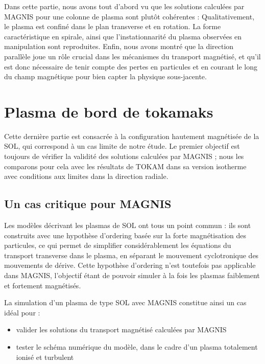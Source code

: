 \begin{refsection}
Dans cette partie, nous avons tout d'abord vu que 
les solutions calculées par MAGNIS pour une colonne de plasma
sont plutôt cohérentes : Qualitativement, le plasma est confiné dans le plan
transverse et en rotation. La forme caractéristique en spirale, ainsi que
l'instationnarité du plasma observées en manipulation sont reproduites. 
Enfin, nous avons montré que la direction parallèle joue un rôle crucial dans
les mécanismes du transport magnétisé, et qu'il est donc nécessaire de
tenir compte des pertes en particules et en courant le long du champ magnétique
pour bien capter la physique sous-jacente.

\section{Plasma de bord de tokamaks}

Cette dernière partie est consacrée à la configuration hautement magnétisée
de la SOL, qui correspond à un cas limite de notre étude. Le premier objectif
est toujours de vérifier la validité des solutions calculées par MAGNIS ; 
nous les comparons pour cela avec les résultats de
TOKAM dans sa version isotherme avec conditions aux limites dans la direction
radiale.

\subsection{Un cas critique pour MAGNIS}
Les modèles décrivant les plasmas de SOL ont tous un
point commun :
ils sont construits avec une hypothèse d'ordering basée sur la forte magnétisation des
particules, ce qui permet de simplifier considérablement les équations
du transport transverse dans le plasma, en séparant le mouvement cyclotronique
des mouvements de dérive.
Cette hypothèse d'ordering n'est
toutefois pas applicable dans MAGNIS, l'objectif étant de pouvoir simuler à la
fois les plasmas faiblement et fortement magnétisés. 

La simulation d'un plasma de type SOL avec MAGNIS constitue ainsi un cas idéal
pour :

\begin{itemize}
  \item valider les solutions du transport magnétisé calculées par MAGNIS
  \item	tester le schéma numérique du modèle, dans le cadre d'un plasma
  totalement ionisé et turbulent
 \end{itemize}
  

\end{refsection}
